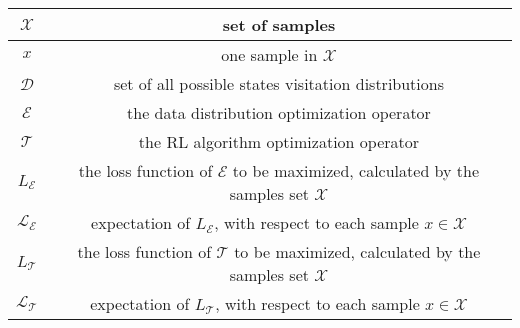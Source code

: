 \begin{table}[!hb]
\begin{tabular}{|c |c| }
	    \hline
	    $\mathcal{X}$ & set of samples \\
	    \hline
	    $x$ & one sample in $\mathcal{X}$ \\
	    \hline
	    $\mathcal{D}$ & set of all possible states visitation distributions \\
	    \hline
	    $\mathcal{E}$ & the data distribution optimization operator \\
	    \hline
	    $\mathcal{T}$ & the RL algorithm optimization operator \\
	    \hline
	    $L_{\mathcal{E}}$ & \makecell[c]{the loss function of $\mathcal{E}$ to be maximized, \\ calculated by the samples set $\mathcal{X}$ }\\
	    \hline
	    $\mathcal{L}_\mathcal{E}$ & \makecell[c]{expectation of $L_{\mathcal{E}}$, \\ with respect to each sample $x \in \mathcal{X}$} \\
	    \hline
	    $L_{\mathcal{T}}$ & \makecell[c]{the loss function of $\mathcal{T}$ to be maximized,\\  calculated by the samples set $\mathcal{X}$} \\
	    \hline
	    $\mathcal{L}_\mathcal{T}$ & \makecell[c]{expectation of $L_{\mathcal{T}}$, \\ with respect to each sample $x \in \mathcal{X}$} \\
		\hline
	\end{tabular} 
\end{table}




